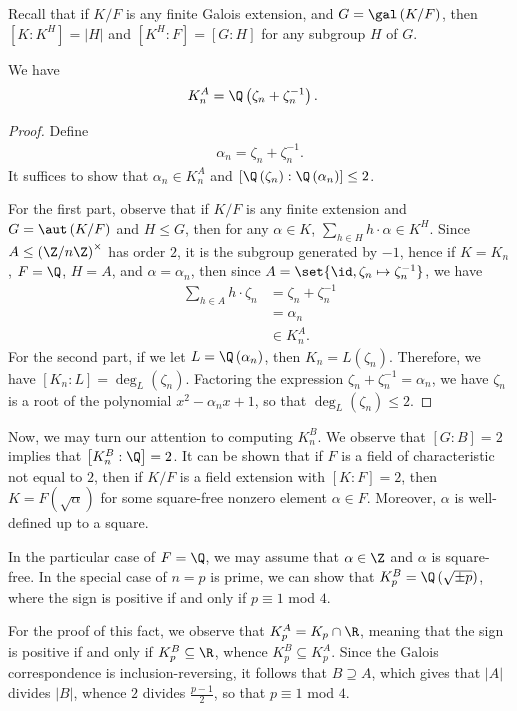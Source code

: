 \documentclass[10pt]{mypackage}
\begin{document}
Recall that if $K/F$ is any finite Galois extension, and $G = \gal\left( K/F \right)$, then $\left[ K:K^{H} \right] = \left\vert H \right\vert$ and $\left[ K^{H}:F \right] = \left[ G:H \right]$ for any subgroup $H$ of $G$.
\begin{proposition}
  We have
  \begin{align*}
    K_n^{A} &= \Q\left( \zeta_{n} + \zeta_{n}^{-1} \right).
  \end{align*}
\end{proposition}
\begin{proof}
  Define
  \begin{align*}
    \alpha_n = \zeta_n + \zeta_n^{-1}.
  \end{align*}
  It suffices to show that $\alpha_n\in K_n^{A}$ and $\left[ \Q\left( \zeta_n \right):\Q\left( \alpha_n \right) \right] \leq 2$.

  For the first part, observe that if $K/F$ is any finite extension and $G = \aut\left( K/F \right)$ and $H\leq G$, then for any $\alpha\in K$, $\sum_{h\in H}h\cdot\alpha\in K^{H}$. Since $A\leq \left( \Z/n\Z \right)^{\times}$ has order $2$, it is the subgroup generated by $-1$, hence if $K = K_n$, $F = \Q$, $H = A$, and $\alpha = \alpha_n$, then since $A = \set{\id,\zeta_n\mapsto \zeta_n^{-1}}$, we have 
  \begin{align*}
    \sum_{h\in A} h\cdot \zeta_n &= \zeta_n + \zeta_n^{-1}\\
                                 &= \alpha_n\\
                                 &\in K_n^{A}.
  \end{align*}
  For the second part, if we let $L = \Q\left( \alpha_n \right)$, then $K_n = L\left( \zeta_n \right)$. Therefore, we have $\left[ K_n:L \right] = \deg_{L}\left( \zeta_n \right)$. Factoring the expression $\zeta_n + \zeta_n^{-1} = \alpha_n$, we have $\zeta_n$ is a root of the polynomial $x^2 - \alpha_n x + 1$, so that $\deg_L\left( \zeta_n \right) \leq 2$.
\end{proof}
Now, we may turn our attention to computing $K_n^{B}$. We observe that $\left[ G:B \right] = 2$ implies that $\left[ K_n^{B}:\Q \right] = 2$. It can be shown that if $F$ is a field of characteristic not equal to $2$, then if $K/F$ is a field extension with $\left[ K:F \right] = 2$, then $K = F\left( \sqrt{\alpha} \right)$ for some square-free nonzero element $\alpha\in F$. Moreover, $\alpha$ is well-defined up to a square.

In the particular case of $F = \Q$, we may assume that $\alpha\in \Z$ and $\alpha$ is square-free. In the special case of $n = p$ is prime, we can show that $K_p^{B} = \Q\left( \sqrt{\pm p} \right)$, where the sign is positive if and only if $p\equiv 1$ mod $4$.

For the proof of this fact, we observe that $K_p^{A} = K_p\cap \R$, meaning that the sign is positive if and only if $K_p^{B}\subseteq \R$, whence $K_p^{B}\subseteq K_p^{A}$. Since the Galois correspondence is inclusion-reversing, it follows that $B\supseteq A$, which gives that $\left\vert A \right\vert $ divides $ \left\vert B \right\vert$, whence $2$ divides $\frac{p-1}{2}$, so that $p\equiv 1$ mod $4$.
\end{document}
